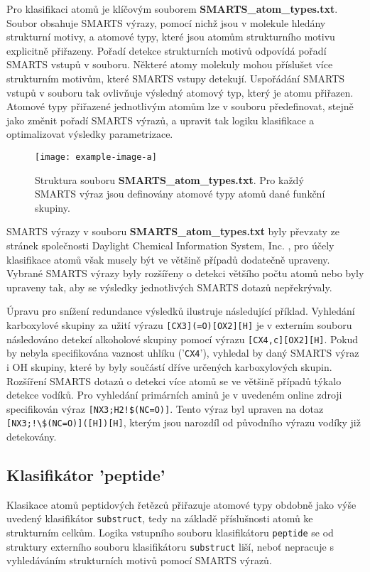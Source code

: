 Pro klasifikaci atomů je klíčovým souborem \textbf{SMARTS\_atom\_types.txt}. Soubor obsahuje SMARTS výrazy, pomocí nichž jsou v molekule hledány strukturní motivy, a atomové typy, které jsou atomům strukturního motivu explicitně přiřazeny.
Pořadí detekce strukturních motivů odpovídá pořadí SMARTS vstupů v souboru. Některé atomy molekuly mohou příslušet více strukturním motivům, které SMARTS vstupy detekují. Uspořádání SMARTS vstupů v souboru tak ovlivňuje výsledný atomový typ, který je atomu přiřazen. Atomové typy přiřazené jednotlivým atomům lze v souboru předefinovat, stejně jako změnit pořadí SMARTS výrazů, a upravit tak logiku klasifikace a optimalizovat výsledky parametrizace.
\begin{figure}[h]
    \centering
    \texttt{[image: example-image-a]}
    \caption{Struktura souboru \textbf{SMARTS\_atom\_types.txt}. Pro každý SMARTS výraz jsou definovány atomové typy atomů dané funkční skupiny.}
    \label{SMARTS_file}
\end{figure}

SMARTS výrazy v souboru \textbf{SMARTS\_atom\_types.txt} byly převzaty ze stránek společnosti Daylight Chemical Information System, Inc. \cite{SMARTS_exm}, pro účely klasifikace atomů však musely být ve většině případů dodatečně upraveny. Vybrané SMARTS výrazy byly rozšířeny o detekci většího počtu atomů nebo byly upraveny tak, aby %
se výsledky jednotlivých SMARTS dotazů nepřekrývaly. 

Úpravu pro snížení redundance výsledků ilustruje následující příklad. Vyhledání karboxylové skupiny za užití výrazu \verb|[CX3](=O)[OX2][H]| je v externím souboru následováno detekcí alkoholové skupiny pomocí výrazu \verb|[CX4,c][OX2][H]|. Pokud by nebyla specifikována vaznost uhlíku ('\verb|CX4|'), vyhledal by daný SMARTS výraz i OH skupiny, které by byly součástí dříve určených karboxylových skupin. Rozšíření SMARTS dotazů o detekci více atomů se ve většině případů týkalo detekce vodíků. Pro vyhledání primárních aminů je v uvedeném online zdroji specifikován výraz \verb|[NX3;H2!$(NC=O)]|. Tento výraz byl upraven
na dotaz \verb|[NX3;!\$(NC=O)]([H])[H]|, kterým jsou narozdíl od původního výrazu vodíky již detekovány.
 
\subsection{Klasifikátor 'peptide'}
Klasikace atomů peptidových řetězců přiřazuje atomové typy obdobně jako výše uvedený klasifikátor \verb|substruct|, tedy na základě příslušnosti atomů ke strukturním celkům. Logika vstupního souboru klasifikátoru \verb|peptide| se od struktury externího souboru klasifikátoru \verb|substruct| liší, neboť nepracuje s vyhledáváním strukturních motivů pomocí SMARTS výrazů. 

